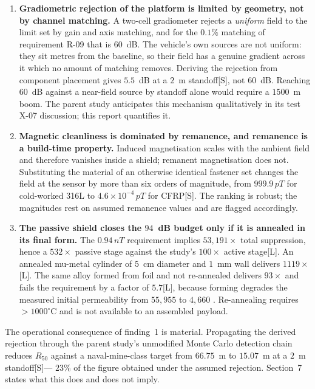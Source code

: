\documentclass[11pt]{article}
\newcommand{\nT}{\,nT}\newcommand{\pT}{\,pT}\newcommand{\fT}{\,fT}
\newcommand{\sig}{\textcolor{violet!70!black}{\footnotesize[S]}}
\newcommand{\lit}{\textcolor{teal!70!black}{\footnotesize[L]}}
\begin{document}
\begin{enumerate}[leftmargin=1.5em]
\item \textbf{Gradiometric rejection of the platform is limited by geometry, not
by channel matching.} A two-cell gradiometer rejects a \emph{uniform} field to
the limit set by gain and axis matching, and for the $0.1\%$ matching of
requirement R-09 that is $60$~dB. The vehicle's own sources are not uniform:
they sit metres from the baseline, so their field has a genuine gradient across
it which no amount of matching removes. Deriving the rejection from component
placement gives $5.5$~dB at a $2$~m standoff\sig, not $60$~dB. Reaching $60$~dB
against a near-field source by standoff alone would require a $1500$~m boom.
The parent study anticipates this mechanism qualitatively in its test X-07
discussion; this report quantifies it.

\item \textbf{Magnetic cleanliness is dominated by remanence, and remanence is a
build-time property.} Induced magnetisation scales with the ambient field and
therefore vanishes inside a shield; remanent magnetisation does not. Substituting
the material of an otherwise identical fastener set changes the field at the
sensor by more than six orders of magnitude, from $999.9\pT$ for cold-worked
316L to $4.6\times10^{-4}\pT$ for CFRP\sig. The ranking is robust; the
magnitudes rest on assumed remanence values and are flagged accordingly.

\item \textbf{The passive shield closes the $94$~dB budget only if it is annealed
in its final form.} The $0.94\nT$ requirement implies $53{,}191\times$ total
suppression, hence a $532\times$ passive stage against the study's $100\times$
active stage\lit. An annealed mu-metal cylinder of $5$~cm diameter and $1$~mm
wall delivers $1119\times$\lit. The same alloy formed from foil and not
re-annealed delivers $93\times$ and fails the requirement by a factor of
$5.7$\lit, because forming degrades the measured initial permeability from
$55{,}955$ to $4{,}660$ \cite{gohil2020}. Re-annealing requires ${>}1000^\circ$C
and is not available to an assembled payload.
\end{enumerate}

The operational consequence of finding~1 is material. Propagating the derived
rejection through the parent study's unmodified Monte Carlo detection chain
reduces $R_{50}$ against a naval-mine-class target from $66.75$~m to
$15.07$~m at a $2$~m standoff\sig --- $23\%$ of the figure obtained under the
assumed rejection. Section~7 states what this does and does not imply.
\end{document}
